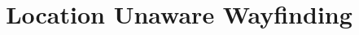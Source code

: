 \documentclass{iitkthesis}
\begin{document}

\title{Location Unaware Wayfinding}
%
%
%
%
%
\end{document}

